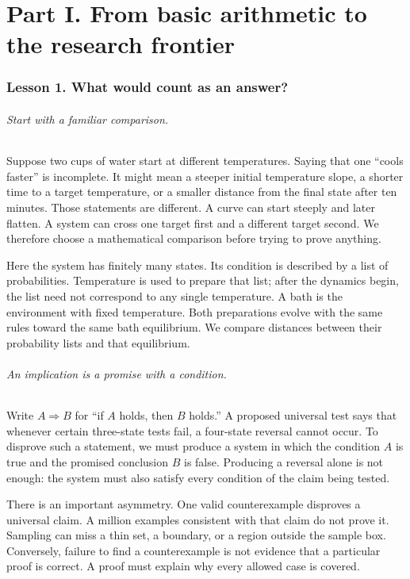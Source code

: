 \clearpage
\tableofcontents
\clearpage
\part*{Part I. From basic arithmetic to the research frontier}

\section*{Lesson 1. What would count as an answer?}
\paragraph{Start with a familiar comparison.}
Suppose two cups of water start at different temperatures. Saying that one
``cools faster'' is incomplete. It might mean a steeper initial temperature
slope, a shorter time to a target temperature, or a smaller distance from the
final state after ten minutes. Those statements are different. A curve can
start steeply and later flatten. A system can cross one target first and a
different target second. We therefore choose a mathematical comparison before
trying to prove anything.

Here the system has finitely many states. Its condition is described by a list
of probabilities. Temperature is used to prepare that list; after the dynamics
begin, the list need not correspond to any single temperature. A bath is the
environment with fixed temperature. Both preparations evolve with the same
rules toward the same bath equilibrium. We compare distances between their
probability lists and that equilibrium.

\paragraph{An implication is a promise with a condition.}
Write $A\Rightarrow B$ for ``if $A$ holds, then $B$ holds.'' A proposed universal
test says that whenever certain three-state tests fail, a four-state reversal
cannot occur. To disprove such a statement, we must produce a system in which
the condition $A$ is true and the promised conclusion $B$ is false. Producing a
reversal alone is not enough: the system must also satisfy every condition of
the claim being tested.

There is an important asymmetry. One valid counterexample disproves a universal
claim. A million examples consistent with that claim do not prove it. Sampling
can miss a thin set, a boundary, or a region outside the sample box. Conversely,
failure to find a counterexample is not evidence that a particular proof is
correct. A proof must explain why every allowed case is covered.

